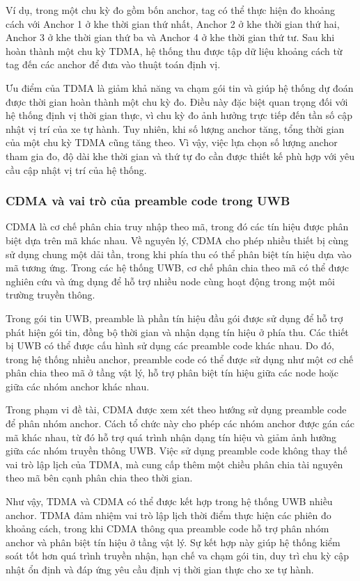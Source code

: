 \documentclass[
  a4paper,
]{report}
\begin{document}
Ví dụ, trong một chu kỳ đo gồm bốn anchor, tag có thể thực hiện đo
khoảng cách với Anchor 1 ở khe thời gian thứ nhất, Anchor 2 ở khe thời
gian thứ hai, Anchor 3 ở khe thời gian thứ ba và Anchor 4 ở khe thời
gian thứ tư. Sau khi hoàn thành một chu kỳ TDMA, hệ thống thu được tập
dữ liệu khoảng cách từ tag đến các anchor để đưa vào thuật toán định vị.

Ưu điểm của TDMA là giảm khả năng va chạm gói tin và giúp hệ thống dự
đoán được thời gian hoàn thành một chu kỳ đo. Điều này đặc biệt quan
trọng đối với hệ thống định vị thời gian thực, vì chu kỳ đo ảnh hưởng
trực tiếp đến tần số cập nhật vị trí của xe tự hành. Tuy nhiên, khi số
lượng anchor tăng, tổng thời gian của một chu kỳ TDMA cũng tăng theo. Vì
vậy, việc lựa chọn số lượng anchor tham gia đo, độ dài khe thời gian và
thứ tự đo cần được thiết kế phù hợp với yêu cầu cập nhật vị trí của hệ
thống.

\subsubsection{CDMA và vai trò của preamble code trong UWB}

CDMA là cơ chế phân chia truy nhập theo mã, trong đó các tín hiệu được
phân biệt dựa trên mã khác nhau. Về nguyên lý, CDMA cho phép nhiều thiết
bị cùng sử dụng chung một dải tần, trong khi phía thu có thể phân biệt
tín hiệu dựa vào mã tương ứng. Trong các hệ thống UWB, cơ chế phân chia
theo mã có thể được nghiên cứu và ứng dụng để hỗ trợ nhiều node cùng
hoạt động trong một môi trường truyền thông.

Trong gói tin UWB, preamble là phần tín hiệu đầu gói được sử dụng để hỗ
trợ phát hiện gói tin, đồng bộ thời gian và nhận dạng tín hiệu ở phía
thu. Các thiết bị UWB có thể được cấu hình sử dụng các preamble code
khác nhau. Do đó, trong hệ thống nhiều anchor, preamble code có thể được
sử dụng như một cơ chế phân chia theo mã ở tầng vật lý, hỗ trợ phân biệt
tín hiệu giữa các node hoặc giữa các nhóm anchor khác nhau.

Trong phạm vi đề tài, CDMA được xem xét theo hướng sử dụng preamble code
để phân nhóm anchor. Cách tổ chức này cho phép các nhóm anchor được gán
các mã khác nhau, từ đó hỗ trợ quá trình nhận dạng tín hiệu và giảm ảnh
hưởng giữa các nhóm truyền thông UWB. Việc sử dụng preamble code không
thay thế vai trò lập lịch của TDMA, mà cung cấp thêm một chiều phân chia
tài nguyên theo mã bên cạnh phân chia theo thời gian.

Như vậy, TDMA và CDMA có thể được kết hợp trong hệ thống UWB nhiều
anchor. TDMA đảm nhiệm vai trò lập lịch thời điểm thực hiện các phiên đo
khoảng cách, trong khi CDMA thông qua preamble code hỗ trợ phân nhóm
anchor và phân biệt tín hiệu ở tầng vật lý. Sự kết hợp này giúp hệ thống
kiểm soát tốt hơn quá trình truyền nhận, hạn chế va chạm gói tin, duy
trì chu kỳ cập nhật ổn định và đáp ứng yêu cầu định vị thời gian thực
cho xe tự hành.
\end{document}
